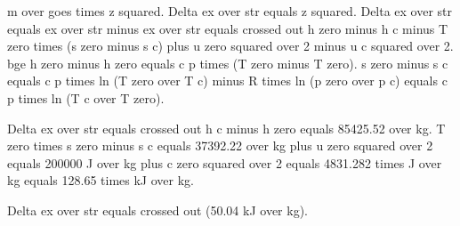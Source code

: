 m over goes times z squared. Delta ex over str equals z squared.
Delta ex over str equals ex over str minus ex over str equals crossed out h zero minus h c minus T zero times (s zero minus s c) plus u zero squared over 2 minus u c squared over 2.
bge h zero minus h zero equals c p times (T zero minus T zero).
s zero minus s c equals c p times ln (T zero over T c) minus R times ln (p zero over p c) equals c p times ln (T c over T zero).

Delta ex over str equals crossed out h c minus h zero equals 85425.52 over kg.
T zero times s zero minus s c equals 37392.22 over kg plus u zero squared over 2 equals 200000 J over kg plus c zero squared over 2 equals 4831.282 times J over kg equals 128.65 times kJ over kg.

Delta ex over str equals crossed out (50.04 kJ over kg).
